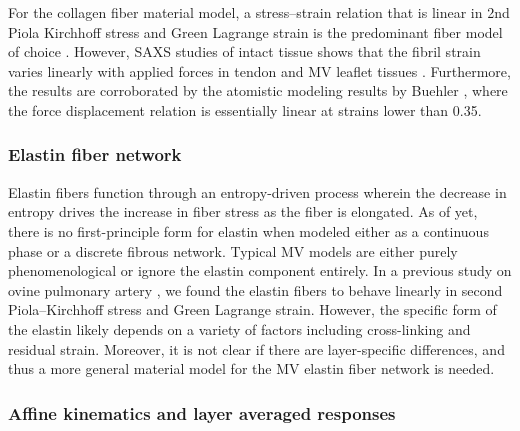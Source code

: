     
    For the collagen fiber material model, a stress–strain relation that is linear in 2nd Piola Kirchhoff stress and Green Lagrange strain is the predominant fiber model of choice \cite{sacks_incorporation_2003,lanir_structural_1979,fan_simulation_2014}. However, SAXS studies of intact tissue shows that the fibril strain varies linearly with applied forces in tendon \cite{sasaki_elongation_1996,sasaki_stress_1996} and MV leaflet tissues \cite{liao_relation_2007}. Furthermore, the results are corroborated by the atomistic modeling results by Buehler \cite{buehler_atomistic_2006}, where the force displacement relation is essentially linear at strains lower than 0.35.
    



\subsubsection{Elastin fiber network} \label{sec:elastinconsiderations}

    Elastin fibers function through an entropy-driven process wherein the decrease in entropy drives the increase in fiber stress as the fiber is elongated. As of yet, there is no first-principle form for elastin when modeled either as a continuous phase or a discrete fibrous network. Typical MV models are either purely phenomenological or ignore the elastin component entirely. In a previous study on ovine pulmonary artery \cite{fata_insights_2014}, we found the elastin fibers to behave linearly in second Piola–Kirchhoff stress and Green Lagrange strain. However, the specific form of the elastin likely depends on a variety of factors including cross-linking and residual strain. Moreover, it is not clear if there are layer-specific differences, and thus a more general material model for the MV elastin fiber network is needed.




\subsubsection{Affine kinematics and layer averaged responses}

